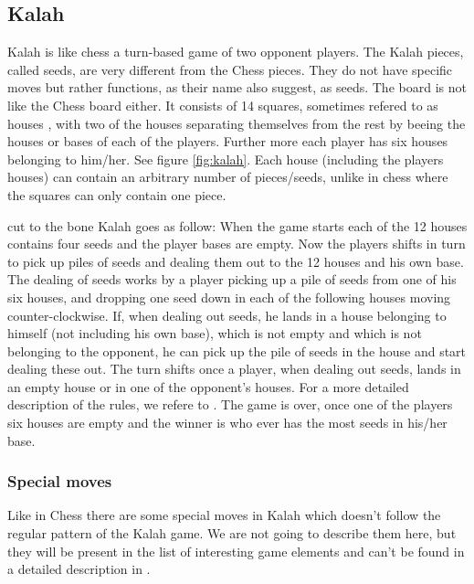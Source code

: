 \subsection{Kalah}

Kalah is like chess a turn-based game of two opponent players. The Kalah pieces, called seeds, are very different from the Chess pieces. They do not have specific moves but rather functions, as their name also suggest, as seeds. The board is not like the Chess board either. It consists of 14 squares, sometimes refered to as houses \cite{kalahrules}, with two of the houses separating themselves from the rest by beeing the houses or bases of each of the players. Further more each player has six houses belonging to him/her. See figure \ref{fig:kalah}. Each house (including the players houses) can contain an arbitrary number of pieces/seeds, unlike in chess where the squares can only contain one piece.  

cut to the bone Kalah goes as follow: When the game starts each of the 12 houses contains four seeds and the player bases are empty. Now the players shifts in turn to pick up piles of seeds and dealing them out to the 12 houses and his own base. The dealing of seeds works by a player picking up a pile of seeds from one of his six houses, and dropping one seed down in each of the following houses moving counter-clockwise. If, when dealing out seeds, he lands in a house belonging to himself (not including his own base), which is not empty and which is not belonging to the opponent, he can pick up the pile of seeds in the house and start dealing these out. The turn shifts once a player, when dealing out seeds, lands in an empty house or in one of the opponent's houses. For a more detailed description of the rules, we refere to \cite{kalahrules}. The game is over, once one of the players six houses are empty and the winner is who ever has the most seeds in his/her base.


\subsubsection{Special moves}
Like in Chess there are some special moves in Kalah which doesn't follow the regular pattern of the Kalah game. We are not going to describe them here, but they will be present in the list of interesting game elements and can't be found in a detailed description in \cite{kalahrules}.

